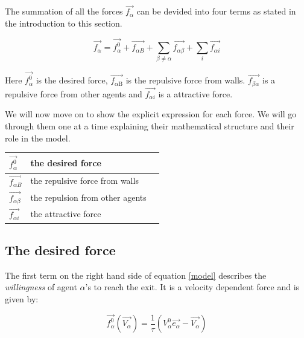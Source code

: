 The summation of all the forces $\overrightarrow{f_{\alpha}}$ can be devided into four 
terms as stated in the introduction to this section.

\begin{equation}\label{model}
    \overrightarrow{f_{\alpha}} = \overrightarrow{f^{0}_{\alpha}} + \overrightarrow{f_{\alpha B}} +
    \sum_{\beta \neq \alpha} \overrightarrow{f_{\alpha \beta}} +  
    \sum_{i} \overrightarrow{f_{\alpha i}} 
\end{equation}

Here $\overrightarrow{f_{\alpha}^{0}}$ is the desired force, $\overrightarrow{f_{\alpha 
\text{B}}}$ is the repulsive force from walls. $\overrightarrow{f_{\beta\alpha}}$ 
is a repulsive force from other agents and $\overrightarrow{f_{\alpha i}}$ is a 
attractive force.

We will now move on to show the explicit expression for each force. We will go 
through them one at a time explaining their mathematical structure and their 
role in the model.

\begin{center}
\begin{tabular}{lll}
\hline
$\overrightarrow{f_{\alpha}^{0}}$ & the desired force &\\
\hline
$\overrightarrow{f_{\alpha B}}$ & the repulsive force from walls &\\
\hline
$\overrightarrow{f_{\alpha \beta}}$ & the repulsion from other agents\\
\hline
$\overrightarrow{f_{\alpha i}}$& the attractive force\\
\hline
\end{tabular}
\end{center}

\subsection{The desired force}
\label{sec:desired-force}
The first term on the right hand side of equation \eqref{model} describes the 
\emph{willingness} of agent $\alpha$'s to reach the exit. It is a velocity 
dependent force and is given by:

\begin{equation}\label{relaxtime}
	\overrightarrow{f^{0}_{\alpha}}\left( \overrightarrow{V_{\alpha}} \right) =
    \frac{1}{\tau}
    \left( V_{\alpha}^{0} \overrightarrow{e_{\alpha}} - \overrightarrow{V_{\alpha}} \right)
\end{equation}


